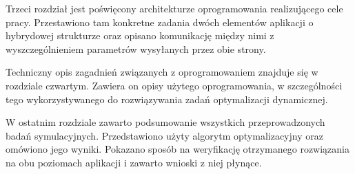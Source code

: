 Trzeci rozdział jest poświęcony architekturze oprogramowania realizującego cele pracy. Przestawiono tam konkretne zadania dwóch elementów aplikacji o hybrydowej strukturze oraz opisano komunikację między nimi z wyszczególnieniem parametrów wysyłanych przez obie strony.

Techniczny opis zagadnień związanych z oprogramowaniem znajduje się w rozdziale czwartym. Zawiera on opisy użytego oprogramowania, w szczególności tego wykorzystywanego do rozwiązywania zadań optymalizacji dynamicznej.

W ostatnim rozdziale zawarto podsumowanie wszystkich przeprowadzonych badań symulacyjnych. Przedstawiono użyty algorytm optymalizacyjny oraz omówiono jego wyniki. Pokazano sposób na weryfikację otrzymanego rozwiązania na obu poziomach aplikacji i zawarto wnioski z niej płynące.
